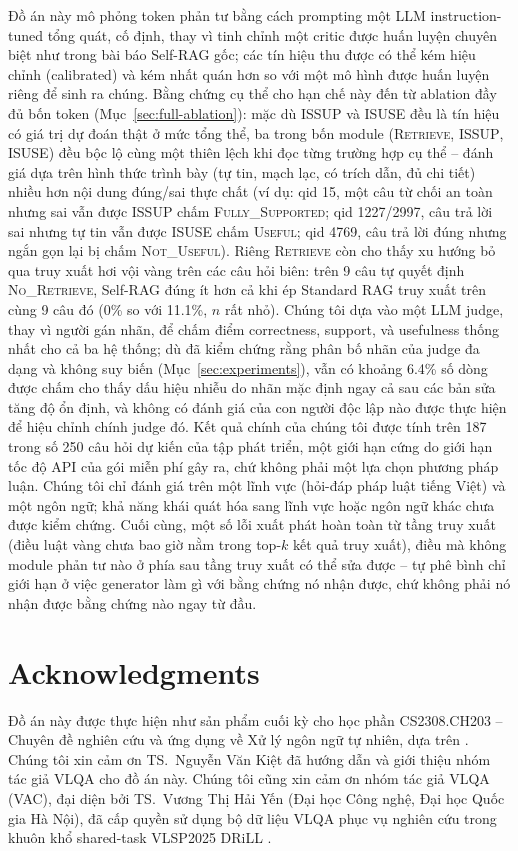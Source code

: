 \documentclass[11pt]{article}
\begin{document}
Đồ án này mô phỏng token phản tư bằng cách prompting một LLM instruction-tuned tổng quát, cố định, thay vì tinh chỉnh một critic được huấn luyện chuyên biệt như trong bài báo Self-RAG gốc; các tín hiệu thu được có thể kém hiệu chỉnh (calibrated) và kém nhất quán hơn so với một mô hình được huấn luyện riêng để sinh ra chúng. Bằng chứng cụ thể cho hạn chế này đến từ ablation đầy đủ bốn token (Mục~\ref{sec:full-ablation}): mặc dù \textsc{ISSUP} và \textsc{ISUSE} đều là tín hiệu có giá trị dự đoán thật ở mức tổng thể, ba trong bốn module (\textsc{Retrieve}, \textsc{ISSUP}, \textsc{ISUSE}) đều bộc lộ cùng một thiên lệch khi đọc từng trường hợp cụ thể -- đánh giá dựa trên hình thức trình bày (tự tin, mạch lạc, có trích dẫn, đủ chi tiết) nhiều hơn nội dung đúng/sai thực chất (ví dụ: qid 15, một câu từ chối an toàn nhưng sai vẫn được \textsc{ISSUP} chấm \textsc{Fully\_Supported}; qid 1227/2997, câu trả lời sai nhưng tự tin vẫn được \textsc{ISUSE} chấm \textsc{Useful}; qid 4769, câu trả lời đúng nhưng ngắn gọn lại bị chấm \textsc{Not\_Useful}). Riêng \textsc{Retrieve} còn cho thấy xu hướng bỏ qua truy xuất hơi vội vàng trên các câu hỏi biên: trên 9 câu tự quyết định \textsc{No\_Retrieve}, Self-RAG đúng ít hơn cả khi ép Standard RAG truy xuất trên cùng 9 câu đó (0\% so với 11.1\%, $n$ rất nhỏ). Chúng tôi dựa vào một LLM judge, thay vì người gán nhãn, để chấm điểm correctness, support, và usefulness thống nhất cho cả ba hệ thống; dù đã kiểm chứng rằng phân bố nhãn của judge đa dạng và không suy biến (Mục~\ref{sec:experiments}), vẫn có khoảng 6.4\% số dòng được chấm cho thấy dấu hiệu nhiễu do nhãn mặc định ngay cả sau các bản sửa tăng độ ổn định, và không có đánh giá của con người độc lập nào được thực hiện để hiệu chỉnh chính judge đó. Kết quả chính của chúng tôi được tính trên 187 trong số 250 câu hỏi dự kiến của tập phát triển, một giới hạn cứng do giới hạn tốc độ API của gói miễn phí gây ra, chứ không phải một lựa chọn phương pháp luận. Chúng tôi chỉ đánh giá trên một lĩnh vực (hỏi-đáp pháp luật tiếng Việt) và một ngôn ngữ; khả năng khái quát hóa sang lĩnh vực hoặc ngôn ngữ khác chưa được kiểm chứng. Cuối cùng, một số lỗi xuất phát hoàn toàn từ tầng truy xuất (điều luật vàng chưa bao giờ nằm trong top-$k$ kết quả truy xuất), điều mà không module phản tư nào ở phía sau tầng truy xuất có thể sửa được -- tự phê bình chỉ giới hạn ở việc generator làm gì với bằng chứng nó nhận được, chứ không phải nó nhận được bằng chứng nào ngay từ đầu.

\section*{Acknowledgments}
Đồ án này được thực hiện như sản phẩm cuối kỳ cho học phần CS2308.CH203 -- Chuyên đề nghiên cứu và ứng dụng về Xử lý ngôn ngữ tự nhiên, dựa trên \citet{asai2024selfrag}. Chúng tôi xin cảm ơn TS.~Nguyễn Văn Kiệt đã hướng dẫn và giới thiệu nhóm tác giả VLQA cho đồ án này. Chúng tôi cũng xin cảm ơn nhóm tác giả VLQA (VAC), đại diện bởi TS.~Vương Thị Hải Yến (Đại học Công nghệ, Đại học Quốc gia Hà Nội), đã cấp quyền sử dụng bộ dữ liệu VLQA \citep{vuong2025vlqa} phục vụ nghiên cứu trong khuôn khổ shared-task VLSP2025 DRiLL \citep{vlsp2025drill}.


\end{document}
